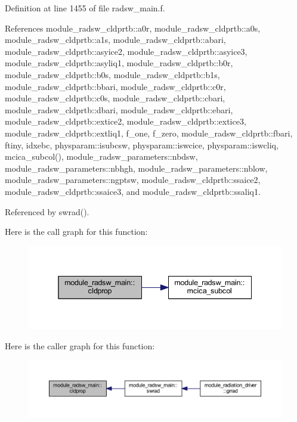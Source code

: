 Definition at line 1455 of file radsw\+\_\+main.\+f.



References module\+\_\+radsw\+\_\+cldprtb\+::a0r, module\+\_\+radsw\+\_\+cldprtb\+::a0s, module\+\_\+radsw\+\_\+cldprtb\+::a1s, module\+\_\+radsw\+\_\+cldprtb\+::abari, module\+\_\+radsw\+\_\+cldprtb\+::asyice2, module\+\_\+radsw\+\_\+cldprtb\+::asyice3, module\+\_\+radsw\+\_\+cldprtb\+::asyliq1, module\+\_\+radsw\+\_\+cldprtb\+::b0r, module\+\_\+radsw\+\_\+cldprtb\+::b0s, module\+\_\+radsw\+\_\+cldprtb\+::b1s, module\+\_\+radsw\+\_\+cldprtb\+::bbari, module\+\_\+radsw\+\_\+cldprtb\+::c0r, module\+\_\+radsw\+\_\+cldprtb\+::c0s, module\+\_\+radsw\+\_\+cldprtb\+::cbari, module\+\_\+radsw\+\_\+cldprtb\+::dbari, module\+\_\+radsw\+\_\+cldprtb\+::ebari, module\+\_\+radsw\+\_\+cldprtb\+::extice2, module\+\_\+radsw\+\_\+cldprtb\+::extice3, module\+\_\+radsw\+\_\+cldprtb\+::extliq1, f\+\_\+one, f\+\_\+zero, module\+\_\+radsw\+\_\+cldprtb\+::fbari, ftiny, idxebc, physparam\+::isubcsw, physparam\+::iswcice, physparam\+::iswcliq, mcica\+\_\+subcol(), module\+\_\+radsw\+\_\+parameters\+::nbdsw, module\+\_\+radsw\+\_\+parameters\+::nbhgh, module\+\_\+radsw\+\_\+parameters\+::nblow, module\+\_\+radsw\+\_\+parameters\+::ngptsw, module\+\_\+radsw\+\_\+cldprtb\+::ssaice2, module\+\_\+radsw\+\_\+cldprtb\+::ssaice3, and module\+\_\+radsw\+\_\+cldprtb\+::ssaliq1.



Referenced by swrad().



Here is the call graph for this function\+:
\nopagebreak
\begin{figure}[H]
\begin{center}
\leavevmode
\includegraphics[width=338pt]{namespacemodule__radsw__main_ae9779a4f9bc2ddc9d856c844639c9bd3_cgraph}
\end{center}
\end{figure}




Here is the caller graph for this function\+:
\nopagebreak
\begin{figure}[H]
\begin{center}
\leavevmode
\includegraphics[width=350pt]{namespacemodule__radsw__main_ae9779a4f9bc2ddc9d856c844639c9bd3_icgraph}
\end{center}
\end{figure}


